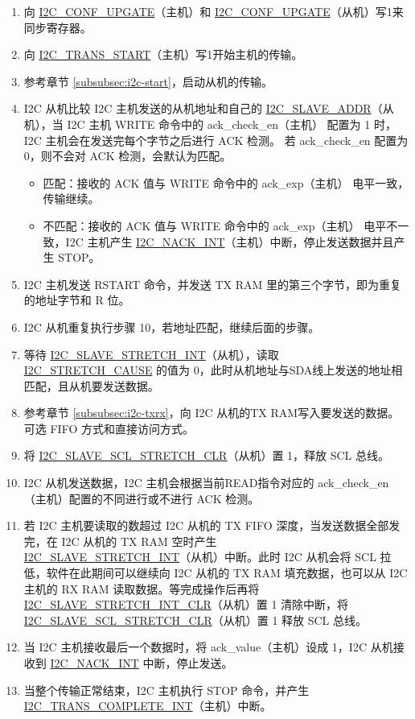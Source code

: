 \documentclass[main\_\_CN.tex]{subfiles}
\begin{document}
\begin{enumerate}
\item 向 \hyperref[fielddesc:I2CCONFUPGATE]{I2C\_CONF\_UPGATE}（主机）和 \hyperref[fielddesc:I2CCONFUPGATE]{I2C\_CONF\_UPGATE}（从机）写1来同步寄存器。
\item 向 \hyperref[fielddesc:I2CTRANSSTART]{I2C\_TRANS\_START}（主机）写1开始主机的传输。
\item 参考章节 \ref{subsubsec:i2c-start}，启动从机的传输。
\item I2C 从机比较 I2C 主机发送的从机地址和自己的 \hyperref[fielddesc:I2CSLAVEADDR]{I2C\_SLAVE\_ADDR}（从机），当 I2C 主机 WRITE 命令中的 ack\_check\_en（主机） 配置为 1 时，I2C 主机会在发送完每个字节之后进行 ACK 检测。 若 ack\_check\_en 配置为 0，则不会对 ACK 检测，会默认为匹配。
\begin{itemize}
\item 匹配：接收的 ACK 值与 WRITE 命令中的 ack\_exp（主机） 电平一致，传输继续。
\item 不匹配：接收的 ACK 值与 WRITE 命令中的 ack\_exp（主机） 电平不一致，I2C 主机产生 \hyperref[int:i2c-nack]{I2C\_NACK\_INT}（主机）中断，停止发送数据并且产生 STOP。
\end{itemize}

\item I2C 主机发送 RSTART 命令，并发送 TX RAM 里的第三个字节，即为重复的地址字节和 R 位。
\item I2C 从机重复执行步骤 10，若地址匹配，继续后面的步骤。


\item 等待 \hyperref[int:i2c-slave-stretch]{I2C\_SLAVE\_STRETCH\_INT}（从机），读取 \hyperref[fielddesc:I2CSTRETCHCAUSE]{I2C\_STRETCH\_CAUSE} 的值为 0，此时从机地址与SDA线上发送的地址相匹配，且从机要发送数据。
\item 参考章节 \ref{subsubsec:i2c-txrx}，向 I2C 从机的TX RAM写入要发送的数据。可选 FIFO 方式和直接访问方式。
\item 将 \hyperref[fielddesc:I2CSLAVESCLSTRETCHCLR]{I2C\_SLAVE\_SCL\_STRETCH\_CLR}（从机）置 1，释放 SCL 总线。


\item I2C 从机发送数据，I2C 主机会根据当前READ指令对应的 ack\_check\_en（主机）配置的不同进行或不进行 ACK 检测。
\item 若 I2C 主机要读取的数超过 I2C 从机的 TX FIFO 深度，当发送数据全部发完，在 I2C 从机的 TX RAM 空时产生 \\\hyperref[int:i2c-slave-stretch]{I2C\_SLAVE\_STRETCH\_INT}（从机）中断。此时 I2C 从机会将 SCL 拉低，软件在此期间可以继续向 I2C 从机的 TX RAM 填充数据，也可以从 I2C 主机的 RX RAM 读取数据。等完成操作后再将 \hyperref[fielddesc:I2CSLAVESTRETCHINTCLR]{I2C\_SLAVE\_STRETCH\_INT\_CLR}（从机）置 1 清除中断，将 \hyperref[fielddesc:I2CSLAVESCLSTRETCHCLR]{I2C\_SLAVE\_SCL\_STRETCH\_CLR}（从机）置 1 释放 SCL 总线。

\item 当 I2C 主机接收最后一个数据时，将 ack\_value（主机）设成 1，I2C 从机接收到 \hyperref[int:i2c-nack]{I2C\_NACK\_INT} 中断，停止发送。

\item 当整个传输正常结束，I2C 主机执行 STOP 命令，并产生 \hyperref[int:i2c-trans-complete]{I2C\_TRANS\_COMPLETE\_INT}（主机）中断。
\end{enumerate}
\end{document}
